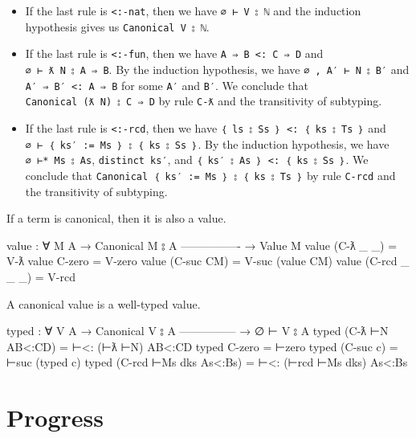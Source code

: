 \begin{itemize}
\item
  If the last rule is \texttt{\textless{}:-nat}, then we have
  \texttt{∅\ ⊢\ V\ ⦂\ ℕ} and the induction hypothesis gives us
  \texttt{Canonical\ V\ ⦂\ ℕ}.
\item
  If the last rule is \texttt{\textless{}:-fun}, then we have
  \texttt{A\ ⇒\ B\ \textless{}:\ C\ ⇒\ D} and
  \texttt{∅\ ⊢\ ƛ\ N\ ⦂\ A\ ⇒\ B}. By the induction hypothesis, we have
  \texttt{∅\ ,\ A′\ ⊢\ N\ ⦂\ B′} and
  \texttt{A′\ ⇒\ B′\ \textless{}:\ A\ ⇒\ B} for some \texttt{A′} and
  \texttt{B′}. We conclude that \texttt{Canonical\ (ƛ\ N)\ ⦂\ C\ ⇒\ D}
  by rule \texttt{C-ƛ} and the transitivity of subtyping.
\item
  If the last rule is \texttt{\textless{}:-rcd}, then we have
  \texttt{｛\ ls\ ⦂\ Ss\ ｝\ \textless{}:\ ｛\ ks\ ⦂\ Ts\ ｝} and
  \texttt{∅\ ⊢\ ｛\ ks′\ :=\ Ms\ ｝\ ⦂\ ｛\ ks\ ⦂\ Ss\ ｝}. By the
  induction hypothesis, we have \texttt{∅\ ⊢*\ Ms\ ⦂\ As},
  \texttt{distinct\ ks′}, and
  \texttt{｛\ ks′\ ⦂\ As\ ｝\ \textless{}:\ ｛\ ks\ ⦂\ Ss\ ｝}. We
  conclude that
  \texttt{Canonical\ ｛\ ks′\ :=\ Ms\ ｝\ ⦂\ ｛\ ks\ ⦂\ Ts\ ｝} by rule
  \texttt{C-rcd} and the transitivity of subtyping.
\end{itemize}

If a term is canonical, then it is also a value.

\begin{fence}
\begin{code}
value : ∀ {M A}
  → Canonical M ⦂ A
    ----------------
  → Value M
value (C-ƛ _ _)     = V-ƛ
value C-zero        = V-zero
value (C-suc CM)    = V-suc (value CM)
value (C-rcd _ _ _) = V-rcd
\end{code}
\end{fence}

A canonical value is a well-typed value.

\begin{fence}
\begin{code}
typed : ∀ {V A}
  → Canonical V ⦂ A
    ---------------
  → ∅ ⊢ V ⦂ A
typed (C-ƛ ⊢N AB<:CD) = ⊢<: (⊢ƛ ⊢N) AB<:CD
typed C-zero = ⊢zero
typed (C-suc c) = ⊢suc (typed c)
typed (C-rcd ⊢Ms dks As<:Bs) = ⊢<: (⊢rcd ⊢Ms dks) As<:Bs
\end{code}
\end{fence}

\hypertarget{progress}{%
\section{\texorpdfstring{Progress }{Progress }}\label{progress}}

